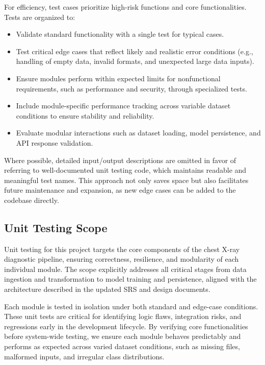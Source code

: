 \documentclass[12pt, titlepage]{article}
\begin{document}
For efficiency, test cases prioritize high-risk functions and core functionalities. Tests are organized to:
\begin{itemize}
  \item Validate standard functionality with a single test for typical cases.
  \item Test critical edge cases that reflect likely and realistic error conditions (e.g., handling of empty data, invalid formats, and unexpected large data inputs).
  \item Ensure modules perform within expected limits for nonfunctional requirements, such as performance and security, through specialized tests.
  \item Include module-specific performance tracking across variable dataset conditions to ensure stability and reliability.
  \item Evaluate modular interactions such as dataset loading, model persistence, and API response validation.
\end{itemize}

Where possible, detailed input/output descriptions are omitted in favor of referring to well-documented unit testing code, which maintains readable and meaningful test names. This approach not only saves space but also facilitates future maintenance and expansion, as new edge cases can be added to the codebase directly.

\subsection{Unit Testing Scope}

Unit testing for this project targets the core components of the chest X-ray diagnostic pipeline, ensuring correctness, resilience, and modularity of each individual module. The scope explicitly addresses all critical stages from data ingestion and transformation to model training and persistence, aligned with the architecture described in the updated SRS and design documents.

Each module is tested in isolation under both standard and edge-case conditions. These unit tests are critical for identifying logic flaws, integration risks, and regressions early in the development lifecycle. By verifying core functionalities before system-wide testing, we ensure each module behaves predictably and performs as expected across varied dataset conditions, such as missing files, malformed inputs, and irregular class distributions.
\end{document}
